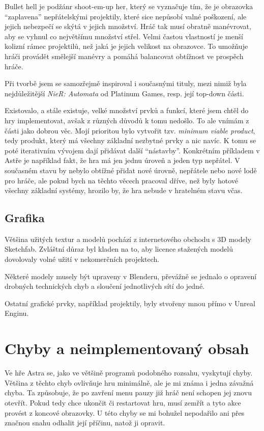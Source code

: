 \documentclass[12pt,a4paper,hidelinks]{article}
\begin{document}
Bullet hell je podžánr shoot-em-up her, který se vyznačuje tím, že je obrazovka \enquote{zaplavena} nepřátelskými projektily, které sice nepůsobí valné poškození, ale jejich nebezpečí se skýtá v jejich množství. Hráč tak musí obratně manévrovat, aby se vyhnul co největšímu množství střel. Velmi častou vlastností je menší kolizní rámec projektilů, než jaká je jejich velikost na obrazovce. To umožňuje hráči provádět smělejší manévry a pomáhá balancovat obtížnost ve prospěch hráče.

Při tvorbě jsem se samozřejmě inspiroval i současnými tituly, mezi nimiž byla nejdůležitější \textit{NieR: Automata}\cite{nier} od Platinum Games, resp. její top-down části.

Existovalo, a stále existuje, velké množství prvků a funkcí, které jsem chtěl do hry implementovat, avšak z různých důvodů k tomu nedošlo. To ale vnímám z části jako dobrou věc. Mojí prioritou bylo vytvořit tzv. \textit{minimum viable product}, tedy produkt, který má všechny základní nezbytné prvky a nic navíc. K tomu se poté iterativním vývojem dají přidávat další \enquote{nástavby}. Konkrétním příkladem v Astře je například fakt, že hra má jen jednu úroveň a jeden typ nepřátel. V současném stavu by nebylo obtížné přidat nové úrovně, nepřátele nebo nové lodě pro hráče, ale pokud bych na těchto věcech pracoval dříve, než byly hotové všechny základní systémy, hrozilo by, že hra nebude v hratelném stavu včas.

\subsection{Grafika}
Většina užitých textur a modelů pochází z internetového obchodu s 3D modely Sketchfab. Zvláštní důraz byl kladen na to, aby licence stažených modelů dovolovaly volné užití v nekomerčních projektech.

Některé modely musely být upraveny v Blenderu, převážně se jednalo o opravení drobných technických chyb a sloučení jednotlivých sítí do jedné.

Ostatní grafické prvky, například projektily, byly stvořeny mnou přímo v Unreal Enginu.

\section{Chyby a neimplementovaný obsah}
Ve hře Astra se, jako ve většině programů podobného rozsahu, vyskytují chyby. Většina z těchto chyb ovlivňuje hru minimálně, ale je mi známa i jedna závažná chyba. Ta způsobuje, že po zavření menu pauzy již hráč není schopen jej znovu otevřít. Pokud tedy chce ukončit či restartovat hru, musí zemřít a tyto akce provést z koncové obrazovky. U této chyby se mi bohužel nepodařilo ani přes značnou snahu odhalit její příčinu, natož ji opravit.
\end{document}
